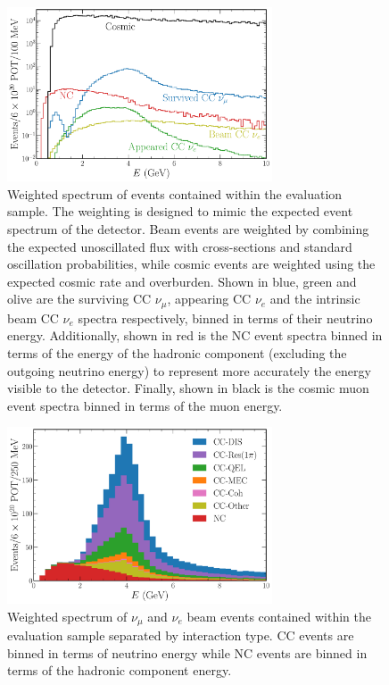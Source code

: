 \begin{figure} %
    \includegraphics[width=0.7\textwidth]{diagrams/7-results/explore_osc_fluxes.pdf}
    \caption[Weighted spectrum of evaluation sample events]
    {Weighted spectrum of events contained within the evaluation sample. The weighting is designed
        to mimic the expected event spectrum of the \chipsfive detector. Beam events are weighted
        by combining the expected unoscillated flux with cross-sections and standard oscillation
        probabilities, while cosmic events are weighted using the expected cosmic rate and
        overburden. Shown in blue, green and olive are the surviving CC $\nu_{\mu}$, appearing CC
        $\nu_{e}$ and the intrinsic beam CC $\nu_{e}$ spectra respectively, binned in terms of
        their neutrino energy. Additionally, shown in red is the NC event spectra binned in terms
        of the energy of the hadronic component (excluding the outgoing neutrino energy) to
        represent more accurately the energy visible to the detector. Finally, shown in black is
        the cosmic muon event spectra binned in terms of the muon energy.}
    \label{fig:explore_osc_fluxes}
\end{figure}

\begin{figure} %
    \includegraphics[width=0.7\textwidth]{diagrams/7-results/explore_stacked_int_types.pdf}
    \caption[Weighted spectrum of interaction types within the evaluation sample]
    {Weighted spectrum of $\nu_{\mu}$ and $\nu_{e}$ beam events contained within the evaluation
        sample separated by interaction type. CC events are binned in terms of neutrino energy while
        NC events are binned in terms of the hadronic component energy.}
    \label{fig:explore_stacked_int_types}
\end{figure}

